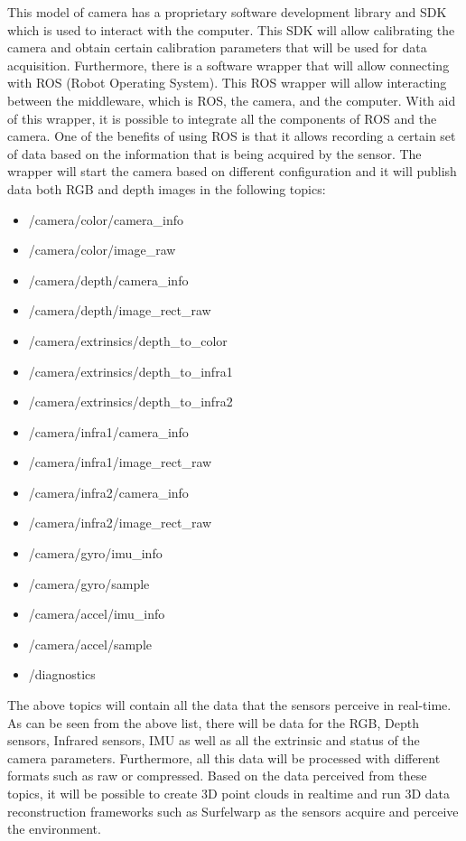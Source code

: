 \documentclass[12pt]{report}
\begin{document}
This model of camera has a proprietary software development library and SDK which is used to interact with the computer. This SDK will allow calibrating the camera and 
obtain certain calibration parameters that will be used for data acquisition. 
Furthermore, there is a software wrapper that will allow connecting with ROS (Robot Operating System). This ROS wrapper will allow interacting between the middleware, which is ROS, the camera, and the computer. 
With aid of this wrapper, it is possible to integrate all the components of ROS and the camera. 
One of the benefits of using ROS is that it allows recording a certain set of data based on the information that is being acquired by the sensor. 
The wrapper will start the camera based on different configuration and it will publish data both RGB and depth images in the following topics:

\begin{itemize}
  \item  /camera/color/camera\_info
  \item  /camera/color/image\_raw
  \item /camera/depth/camera\_info
  \item /camera/depth/image\_rect\_raw
  \item /camera/extrinsics/depth\_to\_color
  \item /camera/extrinsics/depth\_to\_infra1
  \item /camera/extrinsics/depth\_to\_infra2
  \item /camera/infra1/camera\_info
  \item /camera/infra1/image\_rect\_raw
  \item /camera/infra2/camera\_info
  \item /camera/infra2/image\_rect\_raw
  \item /camera/gyro/imu\_info
  \item /camera/gyro/sample
  \item /camera/accel/imu\_info
  \item /camera/accel/sample
  \item /diagnostics
\end{itemize}
The above topics will contain all the data that the sensors perceive in real-time. As can be seen from the above list, there will be data for the RGB, Depth sensors, Infrared sensors, IMU as well as all the extrinsic and status of the camera parameters. 
Furthermore, all this data will be processed with different formats such as raw or compressed. Based on the data perceived from these topics, it will be possible to create 3D point clouds in realtime and run 3D data reconstruction frameworks such as Surfelwarp as the sensors acquire and perceive the environment. 
\end{document}

